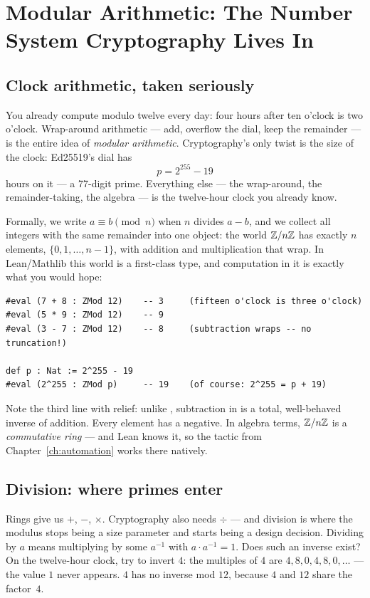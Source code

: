\chapter{Modular Arithmetic: The Number System Cryptography Lives In}
\label{ch:modular}

\section{Clock arithmetic, taken seriously}

You already compute modulo twelve every day: four hours after ten o'clock is
two o'clock. Wrap-around arithmetic --- add, overflow the dial, keep the
remainder --- is the entire idea of \emph{modular arithmetic}. Cryptography's
only twist is the size of the clock: Ed25519's dial has
\[
p = 2^{255} - 19
\]
hours on it --- a 77-digit prime. Everything else --- the wrap-around, the
remainder-taking, the algebra --- is the twelve-hour clock you already know.

Formally, we write $a \equiv b \pmod{n}$ when $n$ divides $a - b$, and we
collect all integers with the same remainder into one object: the world
$\mathbb{Z}/n\mathbb{Z}$ has exactly $n$ elements, $\{0, 1, \dots, n-1\}$, with addition
and multiplication that wrap. In Lean/Mathlib this world is a first-class
type, and computation in it is exactly what you would hope:

\begin{lstlisting}[language=Lean]
#eval (7 + 8 : ZMod 12)    -- 3     (fifteen o'clock is three o'clock)
#eval (5 * 9 : ZMod 12)    -- 9
#eval (3 - 7 : ZMod 12)    -- 8     (subtraction wraps -- no truncation!)

def p : Nat := 2^255 - 19
#eval (2^255 : ZMod p)     -- 19    (of course: 2^255 = p + 19)
\end{lstlisting}

Note the third line with relief: unlike , subtraction in
 is a total, well-behaved inverse of addition. Every element has
a negative. In algebra terms, $\mathbb{Z}/n\mathbb{Z}$ is a \emph{commutative ring} --- and
Lean knows it, so the  tactic from Chapter~\ref{ch:automation}
works there natively.

\section{Division: where primes enter}

Rings give us $+$, $-$, $\times$. Cryptography also needs $\div$ --- and
division is where the modulus stops being a size parameter and starts being a
design decision. Dividing by $a$ means multiplying by some $a^{-1}$ with
$a \cdot a^{-1} = 1$. Does such an inverse exist? On the twelve-hour clock,
try to invert $4$: the multiples of $4$ are $4, 8, 0, 4, 8, 0, \dots$ ---
the value $1$ never appears. $4$ has no inverse mod $12$, because $4$ and
$12$ share the factor~$4$.

